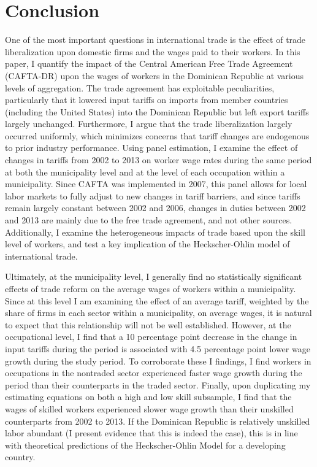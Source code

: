 \documentclass[12pt]{article}
\begin{document}
\vspace{-10pt}
\section{Conclusion}
\label{sec:Conclusion}

One of the most important questions in international trade is the effect of trade liberalization
upon domestic firms and the wages paid to their workers. In this paper, I quantify the impact of 
the Central American Free Trade Agreement (CAFTA-DR) upon the wages of workers in the Dominican 
Republic at various levels of aggregation. The trade agreement has exploitable peculiarities, 
particularly that it lowered input tariffs on imports from member countries (including the United States) 
into the Dominican Republic but left export tariffs largely unchanged. Furthermore, I argue that 
the trade liberalization largely occurred uniformly, which minimizes concerns that tariff changes
are endogenous to prior industry performance. Using panel estimation, I examine the effect
of changes in tariffs from 2002 to 2013 on worker wage rates during the same period at both the 
municipality level and at the level of each occupation within a municipality. 
Since CAFTA was implemented in 2007, this panel allows for local labor markets to fully adjust 
to new changes in tariff barriers, and since tariffs remain largely constant between 2002 and 2006, 
changes in duties between 2002 and 2013 are mainly due to the free trade agreement, and not other 
sources. Additionally, I examine the heterogeneous impacts of trade based upon the skill level of 
workers, and test a key implication of the Heckscher-Ohlin model of international trade. 

Ultimately, at the municipality level, I generally find no statistically significant effects of 
trade reform on the average wages of workers within a municipality. Since at this level I am examining
the effect of an average tariff, weighted by the share of firms in each sector within a municipality,
on average wages, it is natural to expect that this relationship will not be well established.
However, at the occupational level, I find that a 10 percentage point decrease in the change in input 
tariffs during the period is associated with 4.5 percentage point lower wage growth during the study 
period. To corroborate these I findings, I find workers in occupations in the nontraded sector experienced 
faster wage growth during the period than their counterparts in the traded sector. Finally, upon 
duplicating my estimating equations on both a high and low skill subsample, 
I find  that the wages of skilled workers experienced slower wage growth than their unskilled 
counterparts from 2002 to 2013. If the Dominican Republic is relatively unskilled labor
abundant (I present evidence that this is indeed the case), this is in line with theoretical predictions 
of the Heckscher-Ohlin Model for a developing country.
\end{document}
